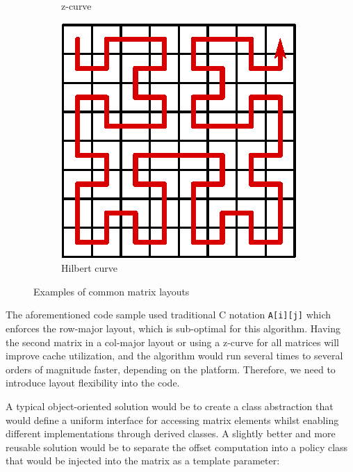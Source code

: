 \begin{figure}
\begin{subfigure}{.19\textwidth}
        \caption{z-curve}
        \label{fig:layout-zcurve}
    \end{subfigure}
    \begin{subfigure}{.19\textwidth}
        \centering
        \includegraphics[width=.9\linewidth]{noarr/figures/matrix-hcurve}
        \caption{Hilbert curve}
        \label{fig:layout-hcurve}
    \end{subfigure}
    
    \caption{Examples of common matrix layouts}
    \label{fig:layout}
    \vspace{-10pt}
\end{figure}

The aforementioned code sample used traditional C notation \texttt{A[i][j]} which enforces the row-major layout, which is sub-optimal for this algorithm. Having the second matrix in a col-major layout or using a z-curve for all matrices will improve cache utilization, and the algorithm would run several times to several orders of magnitude faster, depending on the platform. Therefore, we need to introduce layout flexibility into the code.

A typical object-oriented solution would be to create a class abstraction that would define a uniform interface for accessing matrix elements whilst enabling different implementations through derived classes. A slightly better and more reusable solution would be to separate the offset computation into a policy class that would be injected into the matrix as a template parameter:

